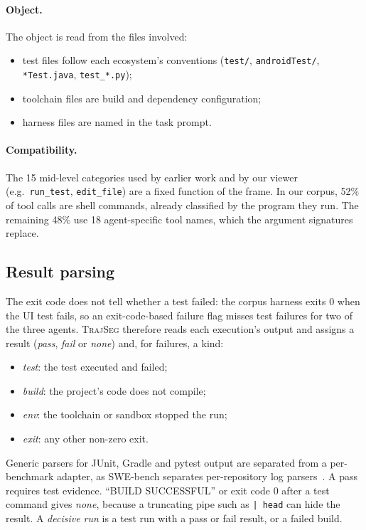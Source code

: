 \documentclass[sigconf,nonacm,10pt]{acmart}
\newcommand{\tool}{\textsc{TrajSeg}}   %
\newcommand{\code}[1]{\texttt{#1}}
\begin{document}
\paragraph{Object.} The object is read from the files involved:
\begin{itemize}
  \item test files follow each ecosystem's conventions (\code{test/},
        \code{androidTest/}, \code{*Test.java}, \code{test\_*.py});
  \item toolchain files are build and dependency configuration;
  \item harness files are named in the task prompt.
\end{itemize}

\paragraph{Compatibility.} The 15 mid-level categories used by earlier work and by our
viewer (e.g.\ \code{run\_test}, \code{edit\_file}) are a fixed function of the frame.
In our corpus, 52\% of tool calls are shell commands, already classified by the
program they run. The remaining 48\% use 18 agent-specific tool names, which the
argument signatures replace.

\subsection{Result parsing}
\label{sec:verdict}
The exit code does not tell whether a test failed: the corpus harness exits 0 when the
UI test fails, so an exit-code-based failure flag misses test failures for two of the
three agents. \tool{} therefore reads each execution's output and assigns a result
(\emph{pass}, \emph{fail} or \emph{none}) and, for failures, a kind:
\begin{itemize}
  \item \emph{test}: the test executed and failed;
  \item \emph{build}: the project's code does not compile;
  \item \emph{env}: the toolchain or sandbox stopped the run;
  \item \emph{exit}: any other non-zero exit.
\end{itemize}
Generic parsers for JUnit, Gradle and pytest output are separated from a per-benchmark
adapter, as SWE-bench separates per-repository log parsers~\cite{jimenez2024swebench}.
A pass requires test evidence. ``BUILD SUCCESSFUL'' or exit code 0 after a test command
gives \emph{none}, because a truncating pipe such as \code{| head} can hide the result.
A \emph{decisive run} is a test run with a pass or fail result, or a failed build.
\end{document}
